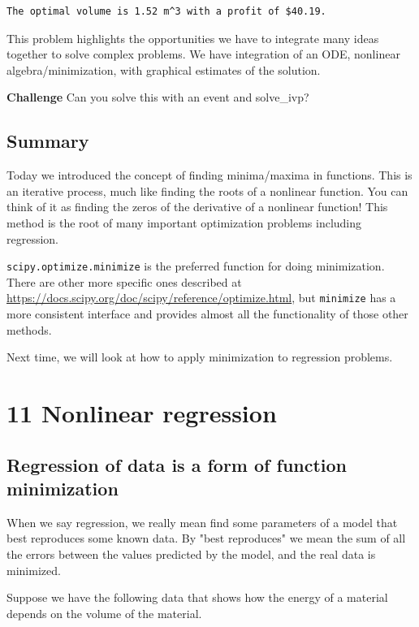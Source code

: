 \documentclass[11pt]{article}
\begin{document}
\begin{verbatim}
The optimal volume is 1.52 m^3 with a profit of $40.19.

\end{verbatim}



This problem highlights the opportunities we have to integrate many ideas together to solve complex problems. We have integration of an ODE, nonlinear algebra/minimization, with graphical estimates of the solution.

\textbf{Challenge} Can you solve this with an event and solve\_ivp?

\subsection{Summary}
\label{sec:orgabcbace}

Today we introduced the concept of finding minima/maxima in functions. This is an iterative process, much like finding the roots of a nonlinear function. You can think of it as finding the zeros of the derivative of a nonlinear function! This method is the root of many important optimization problems including regression.

\texttt{scipy.optimize.minimize} is the preferred function for doing minimization. There are other more specific ones described at \url{https://docs.scipy.org/doc/scipy/reference/optimize.html}, but \texttt{minimize} has a more consistent interface and provides almost all the functionality of those other methods.

Next time, we will look at how to apply minimization to regression problems.

\section{11 Nonlinear regression}
\label{sec:org531b0e7}

\subsection{Regression of data is a form of function minimization}
\label{sec:org500ca89}

When we say regression, we really mean find some parameters of a model that best reproduces some known data. By "best reproduces" we mean the sum of all the errors between the values predicted by the model, and the real data is minimized.

Suppose we have the following data that shows how the energy of a material depends on the volume of the material.
\end{document}
